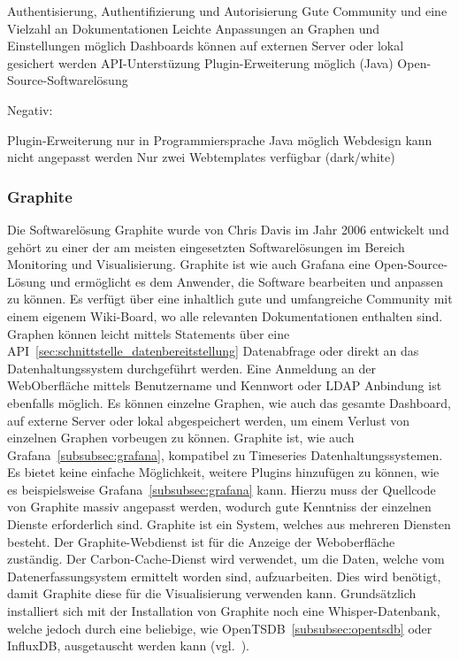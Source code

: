 {\begin{outline}
  \1 Authentisierung, Authentifizierung und Autorisierung
  \1 Gute Community und eine Vielzahl an Dokumentationen
  \1 Leichte Anpassungen an Graphen und Einstellungen möglich
  \1 Dashboards können auf externen Server oder lokal gesichert werden
  \1 API\hyp{}Unterstüzung
  \1 Plugin\hyp{}Erweiterung möglich (Java)
  \1 Open\hyp{}Source\hyp{}Softwarelösung
\end{outline}

Negativ:

\begin{outline}
  \1 Plugin\hyp{}Erweiterung nur in Programmiersprache Java möglich
  \1 Webdesign kann nicht angepasst werden
  \1 Nur zwei Webtemplates verfügbar (dark/white)
\end{outline}
\mr%

\subsubsection{Graphite}
\label{subsubsec:graphite}
Die Softwarelösung Graphite wurde von Chris Davis im Jahr 2006 entwickelt und
gehört zu einer der am meisten eingesetzten Softwarelösungen im Bereich
Monitoring und Visualisierung. Graphite ist wie auch Grafana eine
Open\hyp{}Source\hyp{}Lösung und ermöglicht es dem Anwender, die Software
bearbeiten und anpassen zu können. Es verfügt über eine inhaltlich gute und
umfangreiche Community mit einem eigenem Wiki\hyp{}Board, wo alle relevanten
Dokumentationen enthalten sind. Graphen können leicht mittels Statements über
eine API~\ref{sec:schnittstelle_datenbereitstellung} Datenabfrage oder direkt
an das Datenhaltungssystem durchgeführt werden. Eine Anmeldung an der
WebOberfläche mittels Benutzername und Kennwort oder \gls{LDAP} Anbindung ist
ebenfalls möglich. Es können einzelne Graphen, wie auch das gesamte Dashboard,
auf externe Server oder lokal abgespeichert werden, um einem Verlust von
einzelnen Graphen vorbeugen zu können. Graphite ist, wie auch
Grafana~\ref{subsubsec:grafana}, kompatibel zu Timeseries
Datenhaltungssystemen. Es bietet keine einfache Möglichkeit, weitere Plugins
hinzufügen zu können, wie es beispielsweise Grafana~\ref{subsubsec:grafana}
kann. Hierzu muss der Quellcode von Graphite massiv angepasst werden, wodurch
gute Kenntniss der einzelnen Dienste erforderlich sind. Graphite ist ein
System, welches aus mehreren Diensten besteht. Der Graphite\hyp{}Webdienst ist
für die Anzeige der Weboberfläche zuständig. Der Carbon\hyp{}Cache\hyp{}Dienst
wird verwendet, um die Daten, welche vom Datenerfassungsystem ermittelt worden
sind, aufzuarbeiten. Dies wird benötigt, damit Graphite diese für die
Visualisierung verwenden kann. Grundsätzlich installiert sich mit der
Installation von Graphite noch eine Whisper\hyp{}Datenbank, welche jedoch durch
eine beliebige, wie OpenTSDB~\ref{subsubsec:opentsdb} oder InfluxDB,
ausgetauscht werden kann (vgl.~\cite{graphite}).

}
